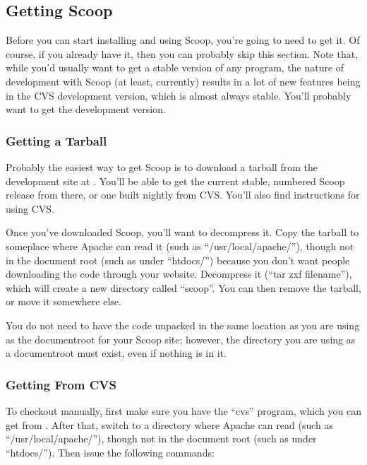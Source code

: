 \subsection{Getting Scoop}

Before you can start installing and using Scoop, you're going to need to get it. Of course, if you already have it, then you can probably skip this section. Note that, while you'd usually want to get a stable version of any program, the nature of development with Scoop (at least, currently) results in a lot of new features being in the CVS development version, which is almost always stable. You'll probably want to get the development version.

\subsubsection{Getting a Tarball}

Probably the easiest way to get Scoop is to download a tarball from the development site at . You'll be able to get the current stable, numbered Scoop release from there, or one built nightly from CVS. You'll also find instructions for using CVS.

Once you've downloaded Scoop, you'll want to decompress it. Copy the tarball to someplace where Apache can read it (such as ``/usr/local/apache/''), though not in the document root (such as under ``htdocs/'') because you don't want people downloading the code through your website. Decompress it (``tar zxf \latexhtml{$<$}{<}filename\latexhtml{$>$}{>}''), which will create a new directory called ``scoop''. You can then remove the tarball, or move it somewhere else.

You do not need to have the code unpacked in the same location as you are using as the documentroot for your Scoop site; however, the directory you are using as a documentroot must exist, even if nothing is in it.  

\subsubsection{Getting From CVS}

To checkout manually, first make sure you have the ``cvs'' program, which you can get from . After that, switch to a directory where Apache can read (such as ``/usr/local/apache/''), though not in the document root (such as under ``htdocs/''). Then issue the following commands:

